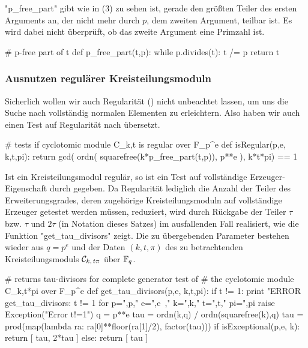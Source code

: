 "p_free_part" gibt wie in  (3) zu sehen ist,
gerade den größten Teiler des ersten Arguments an, der nicht mehr durch $p$,
dem zweiten Argument, teilbar ist. Es wird dabei nicht überprüft, ob das zweite
Argument eine Primzahl ist.


\begin{sagecode}[caption={Aus \url{../Sage/enumeratePCNs.spyx}},
  firstnumber=612]
# p-free part of t
def p_free_part(t,p):
    while p.divides(t):
        t /= p
    return t
\end{sagecode}




\subsubsection{Ausnutzen regulärer Kreisteilungsmoduln}

Sicherlich wollen wir auch Regularität () nicht unbeachtet
lassen, um uns die Suche nach vollständig normalen Elementen zu erleichtern.
Also haben wir auch einen Test auf Regularität nach \sage übersetzt.

\begin{sagecode}[caption={Aus \url{../Sage/enumeratePCNs.spyx}},
  firstnumber=431]
# tests if cyclotomic module C_k,t is regular over F_p^e
def isRegular(p,e, k,t,pi):
    return gcd( ordn( squarefree(k*p_free_part(t,p)), p**e ),  k*t*pi) == 1
\end{sagecode}

Ist ein Kreisteilungsmodul regulär, so ist ein Test auf vollständige
Erzeuger-Eigenschaft durch  gegeben.
Da Regularität lediglich die Anzahl der Teiler des Erweiterungsgrades, deren
zugehörige Kreisteilungsmoduln auf vollständige Erzeuger getestet werden
müssen, reduziert, wird  durch Rückgabe der
Teiler $\tau$ bzw. $\tau$ und $2\tau$ (in Notation dieses Satzes)
im ausfallenden Fall realisiert, wie die Funktion 
"get_tau_divisors" zeigt. Die zu übergebenden Parameter bestehen wieder aus 
$q = p^e$ und der Daten $(k,t,\pi)$ des zu betrachtenden Kreisteilungsmoduls 
$\mathcal{C}_{k,\,t\pi}$ über $\mathbb{F}_q$.

\begin{sagecode}[caption={Aus \url{../Sage/enumeratePCNs.spyx}},
  firstnumber=436]
# returns tau-divisors for complete generator test of 
# the cyclotomic module C_k,t*pi over F_p^e
def get_tau_divisors(p,e, k,t,pi):
    if t != 1:
        print "ERROR get_tau_divisors: t != 1 for p=",p," e=",e\
                ," k=",k," t=",t," pi=",pi
        raise Exception("Error t!=1")
    q = p**e
    tau = ordn(k,q) / ordn(squarefree(k),q)
    tau = prod(map(lambda ra: ra[0]**floor(ra[1]/2), factor(tau)))
    if isExceptional(p,e, k):
        return [ tau, 2*tau ]
    else:
        return [ tau ]
\end{sagecode}

